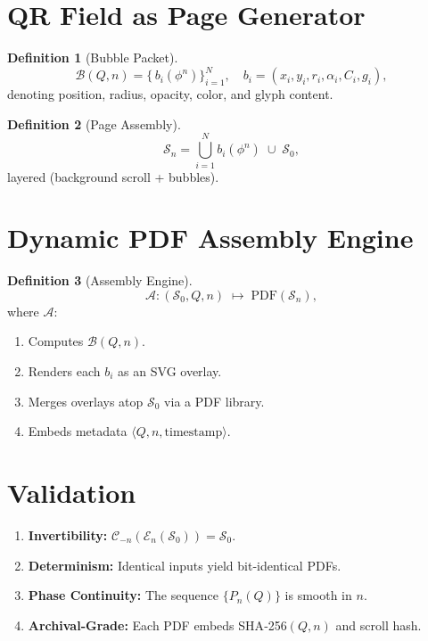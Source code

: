\documentclass[12pt]{article}
\theoremstyle{definition}
\newtheorem{definition}{Definition}[section]
\begin{document}
\section{QR Field as Page Generator}

\begin{definition}[Bubble Packet]
\[
\mathcal{B}(Q,n)
=\{\,b_i(\phi^n)\}_{i=1}^N,
\quad
b_i=(x_i,y_i,r_i,\alpha_i,C_i,g_i),
\]
denoting position, radius, opacity, color, and glyph content.
\end{definition}

\begin{definition}[Page Assembly]
\[
\mathcal{S}_n
=\bigcup_{i=1}^N b_i(\phi^n)\;\cup\;\mathcal{S}_0,
\]
layered (background scroll + bubbles).
\end{definition}

\section{Dynamic PDF Assembly Engine}

\begin{definition}[Assembly Engine]
\[
\mathcal{A}:(\mathcal{S}_0,Q,n)\;\longmapsto\;\mathrm{PDF}(\mathcal{S}_n),
\]
where $\mathcal{A}$:
\begin{enumerate}
  \item Computes $\mathcal{B}(Q,n)$.
  \item Renders each $b_i$ as an SVG overlay.
  \item Merges overlays atop $\mathcal{S}_0$ via a PDF library.
  \item Embeds metadata $\langle Q,n,\mathrm{timestamp}\rangle$.
\end{enumerate}
\end{definition}

\section{Validation}

\begin{enumerate}
  \item \textbf{Invertibility:} 
    $\mathcal{C}_{-n}(\mathcal{E}_n(\mathcal{S}_0))=\mathcal{S}_0$.
  \item \textbf{Determinism:} 
    Identical inputs yield bit‑identical PDFs.
  \item \textbf{Phase Continuity:} 
    The sequence $\{P_n(Q)\}$ is smooth in $n$.
  \item \textbf{Archival‑Grade:} 
    Each PDF embeds SHA‑256$(Q,n)$ and scroll hash.
\end{enumerate}
\end{document}
